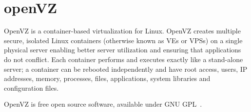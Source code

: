 \section{openVZ}

OpenVZ is a container-based virtualization for Linux. OpenVZ creates
multiple secure, isolated Linux containers (otherwise known as VEs or
VPSs) on a single physical server enabling better server utilization
and ensuring that applications do not conflict. Each container
performs and executes exactly like a stand-alone server; a container
can be rebooted independently and have root access, users, IP
addresses, memory, processes, files, applications, system libraries
and configuration files.

OpenVZ is free open source software, available under GNU
GPL~\cite{www-openvz}.

